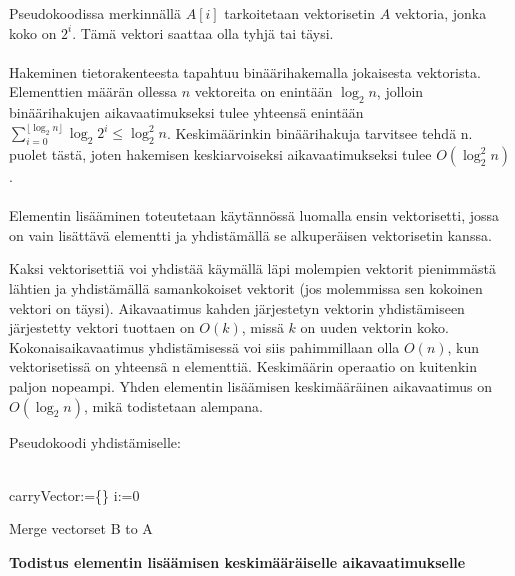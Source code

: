 \documentclass{article}
\begin{document}
    Pseudokoodissa merkinnällä $A[i]$ tarkoitetaan vektorisetin $A$ vektoria, jonka koko on $2^i$. Tämä vektori saattaa
    olla tyhjä tai täysi.
    \\ \\
    Hakeminen tietorakenteesta tapahtuu binäärihakemalla jokaisesta vektorista. Elementtien määrän ollessa $n$ vektoreita on 
    enintään $\log_2n$, jolloin binäärihakujen aikavaatimukseksi tulee yhteensä enintään $\sum_{i=0}^{\lfloor \log_2n \rfloor}
    {\log_2{2^i}}\leq \log_2^2 n$. Keskimäärinkin binäärihakuja tarvitsee tehdä n. puolet tästä, joten hakemisen keskiarvoiseksi
    aikavaatimukseksi tulee $O(\log_2^2 n)$.
    \\ \\
    Elementin lisääminen toteutetaan käytännössä luomalla ensin vektorisetti, jossa on vain lisättävä elementti ja yhdistämällä 
    se alkuperäisen vektorisetin kanssa.
    
    Kaksi vektorisettiä voi yhdistää käymällä läpi molempien vektorit pienimmästä lähtien ja yhdistämällä samankokoiset vektorit 
    (jos molemmissa sen kokoinen vektori on täysi). Aikavaatimus kahden järjestetyn vektorin yhdistämiseen järjestetty vektori
    tuottaen on $O(k)$, missä $k$ on uuden vektorin koko. Kokonaisaikavaatimus yhdistämisessä voi siis pahimmillaan olla $O(n)$,
    kun vektorisetissä on yhteensä n elementtiä. Keskimäärin operaatio on kuitenkin paljon nopeampi. Yhden elementin lisäämisen
    keskimääräinen aikavaatimus on $O(\log_2 n)$, mikä todistetaan alempana.
    
    Pseudokoodi yhdistämiselle:
    \\ \\
    \begin{algorithm}[H]
        carryVector:=\{\}\;
        i:=0\;
        \caption{Merge vectorset B to A}
    \end{algorithm}
    
    \medskip \medskip
    \textbf{Todistus elementin lisäämisen keskimääräiselle aikavaatimukselle}
\end{document}
